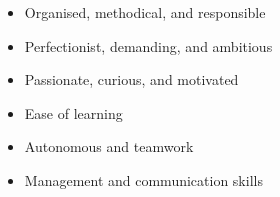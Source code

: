 %
%
%

\twocolumnsection
{
    \vspace{1em}
}
{
    \vspace{1em}
    \begin{itemize}
        \item Organised, methodical, and responsible
        \item Perfectionist, demanding, and ambitious
        \item Passionate, curious, and motivated
        \item Ease of learning
        \item Autonomous and teamwork
        \item Management and communication skills
    \end{itemize}
}
